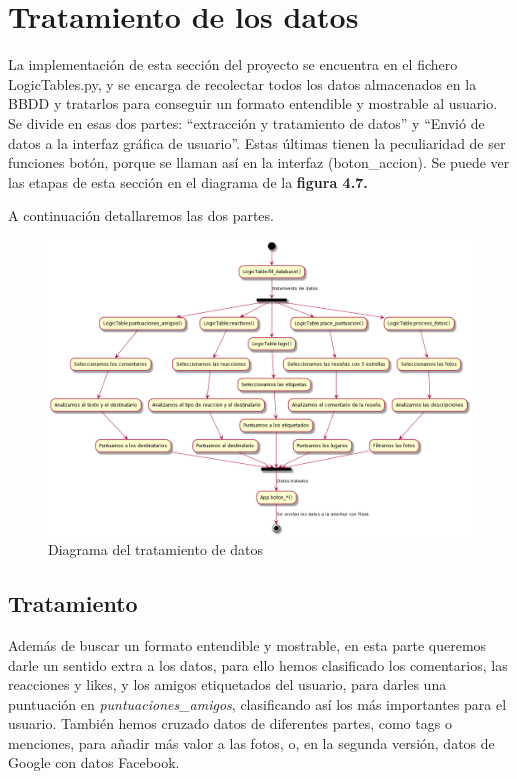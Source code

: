 \section{Tratamiento de los datos}

La implementación de esta sección del proyecto se encuentra en el fichero LogicTables.py, y se encarga de recolectar todos los datos almacenados en la BBDD y tratarlos para conseguir un formato entendible y mostrable al usuario. Se divide en esas dos partes: ``extracción y tratamiento de datos'' y ``Envió de datos a la interfaz gráfica de usuario''. Estas últimas tienen la peculiaridad de ser funciones botón, porque se llaman así en la interfaz (boton\_accion). Se puede ver las etapas de esta sección en el diagrama de la \textbf{figura 4.7.}

A continuación detallaremos las dos partes.
\begin{figure}
	\includegraphics[scale=0.33]{Imagenes/Fuentes/tratamiento.png}
	\caption{Diagrama del tratamiento de datos}
	\label{DiagramaTratamiento}
\end{figure}
 
\subsection{Tratamiento}
Además de buscar un formato entendible y mostrable, en esta parte queremos darle un sentido extra a los datos, para ello hemos clasificado los comentarios, las reacciones y likes, y los amigos etiquetados del usuario, para darles una puntuación en \textit{puntuaciones\_amigos}, clasificando así los más importantes para el usuario. También hemos cruzado datos de diferentes partes, como tags o menciones, para añadir más valor a las fotos, o, en la segunda versión, datos de Google con datos Facebook.

